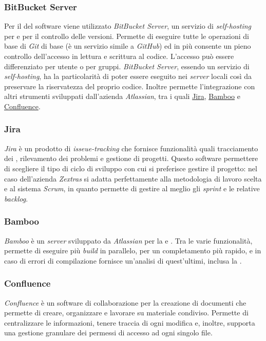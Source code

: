 \subsubsection{BitBucket Server}
Per il  del software viene utilizzato \emph{BitBucket Server}, un servizio di \emph{self-hosting} per   e per il controllo delle versioni. Permette di eseguire tutte le operazioni di base di \emph{Git} di base (è un servizio simile a \emph{GitHub}) ed in più consente un pieno controllo dell'accesso in lettura e scrittura al codice. L'accesso può essere differenziato per utente o per gruppi. \emph{BitBucket Server}, essendo un servizio di \emph{self-hosting}, ha la particolarità di poter essere eseguito nei \emph{server} locali così da preservare la riservatezza del proprio codice. Inoltre permette l'integrazione con altri strumenti sviluppati dall'azienda \emph{Atlassian}, tra i quali \hyperref[subsubsec:jira]{Jira}, \hyperref[subsubsec:bamboo]{Bamboo} e \hyperref[subsubsec:confluence]{Confluence}.
\subsubsection{Jira}\label{subsubsec:jira}
\emph{Jira} è un prodotto di \emph{isseue-tracking} che fornisce funzionalità quali tracciamento dei , rilevamento dei problemi e gestione di progetti. Questo software permettere di scegliere il tipo di ciclo di sviluppo con cui si preferisce gestire il progetto: nel caso dell'azienda \emph{Zextras} si adatta perfettamente alla metodologia di lavoro scelta e al sistema \emph{Scrum}, in quanto permette di gestire al meglio gli \emph{sprint} e le relative \emph{backlog}.
\subsubsection{Bamboo}\label{subsubsec:bamboo}
\emph{Bamboo} è un \emph{server} sviluppato da \emph{Atlassian} per la  e . Tra le varie funzionalità, permette di eseguire più \emph{build} in parallelo, per un completamento più rapido, e in caso di errori di compilazione fornisce un'analisi di quest'ultimi, inclusa la .
\subsubsection{Confluence}\label{subsubsec:confluence}
\emph{Confluence} è un software di collaborazione per la creazione di documenti che permette di creare, organizzare e lavorare su materiale condiviso. Permette di centralizzare le informazioni, tenere traccia di ogni modifica e, inoltre, supporta una gestione granulare dei permessi di accesso ad ogni singolo file.

